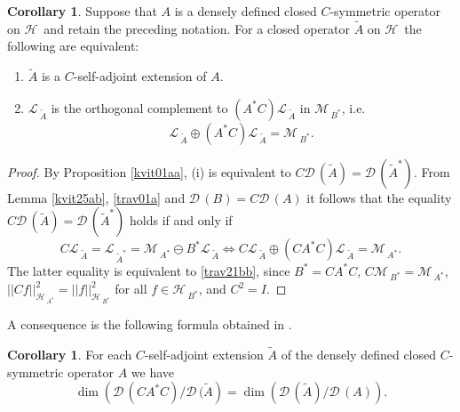 \documentclass[12pt]{amsart}
\theoremstyle{definition}
\newtheorem{cor}[thm]{Corollary}
\newcommand{\cM}{\mathcal{M}\,}
\newcommand{\cL}{\mathcal{L}\,}
\newcommand{\cD}{\mathcal{D}\,}
\newcommand{\cH}{\mathcal{H}\,}
\begin{document}
\begin{cor}\label{kvit24bc} Suppose that $A$ is a densely defined closed $C$-symmetric  operator on $\cH$ and retain the preceding notation. For a closed operator $\widetilde{A}$ on $\cH$ the following are equivalent:
\begin{enumerate}
\item[ (i)]
 $\widetilde{A}$ is a $C$-self-adjoint extension of  $A$.
\item[(ii)]

$\cL_{\widetilde A}$ is the orthogonal complement to $(A^*C)\cL_{\widetilde A}$ in $\cM_{B^*}$, i.e.
\begin{equation}\label{trav21bb}
\cL_{\widetilde A}\oplus (A^*C)\cL_{\widetilde A}=\cM_{B^*}.
\end{equation}
\end{enumerate}
\end{cor}
\begin{proof}
By Proposition \ref{kvit01aa},  (i) is equivalent to $C\cD( \widetilde A)=\cD( \widetilde A^*)$.
From Lemma \ref{kvit25ab},
 \eqref{trav01a} and $\cD( B)=C\cD( A)$ it follows that
the equality $C\cD( \widetilde A)=\cD( \widetilde A^*)$ holds if and only if
\[
C\cL_{\widetilde A}=\cL_{\widetilde A^*}= \cM_{A^*}\ominus B^*\cL_{\widetilde A}
\Longleftrightarrow C\cL_{\widetilde A}\oplus (CA^*C)\cL_{\widetilde A}=\cM_{A^*}.
\]
The latter equality is equivalent to \eqref{trav21bb}, since
$B^*=CA^*C$, $C\cM_{B^*}=\cM_{A^*}$, $||Cf||_{\cH_{A^*}}^2=||f||^2_{\cH_{B^*}}$  for all $f\in \cH_{B^*}$, and $C^2=I$.
\end{proof}

A consequence is the following formula obtained in \cite[Theorem 3.1]{race}.

\begin{cor}\label{kvit30cca}
For each $C$-self-adjoint extension $\widetilde A$ of the densely defined closed $C$-symmetric operator  $A$ we have
\[
\dim \left(\cD(CA^*C)/\cD( \widetilde A\right)=\dim \left(\cD( \widetilde A)/\cD( A)\right).
\]
\end{cor}
\end{document}
